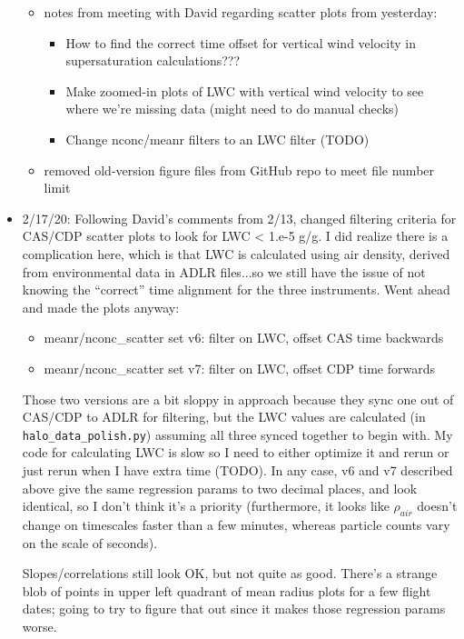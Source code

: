 \documentclass{article}
\begin{document}
\begin{itemize}
\begin{itemize}
		\item notes from meeting with David regarding scatter plots from yesterday:
		\begin{itemize}
			\item How to find the correct time offset for vertical wind velocity in supersaturation calculations???
			\item Make zoomed-in plots of LWC with vertical wind velocity to see where we're missing data (might need to do manual checks)
			\item Change nconc/meanr filters to an LWC filter (TODO)
		\end{itemize}
		\item removed old-version figure files from GitHub repo to meet file number limit
	\end{itemize}
	\item 2/17/20: Following David's comments from 2/13, changed filtering criteria for CAS/CDP scatter plots to look for LWC < 1.e-5 g/g. I did realize there is a complication here, which is that LWC is calculated using air density, derived from environmental data in ADLR files...so we still have the issue of not knowing the ``correct'' time alignment for the three instruments. Went ahead and made the plots anyway:
	\begin{itemize}
		\item meanr/nconc\_scatter set v6: filter on LWC, offset CAS time backwards
		\item meanr/nconc\_scatter set v7: filter on LWC, offset CDP time forwards
	\end{itemize}
	Those two versions are a bit sloppy in approach because they sync one out of CAS/CDP to ADLR for filtering, but the LWC values are calculated (in \texttt{halo\_data\_polish.py}) assuming all three synced together to begin with. My code for calculating LWC is slow so I need to either optimize it and rerun or just rerun when I have extra time (TODO). In any case, v6 and v7 described above give the same regression params to two decimal places, and look identical, so I don't think it's a priority (furthermore, it looks like $\rho_{air}$ doesn't change on timescales faster than a few minutes, whereas particle counts vary on the scale of seconds).

Slopes/correlations still look OK, but not quite as good. There's a strange blob of points in upper left quadrant of mean radius plots for a few flight dates; going to try to figure that out since it makes those regression params worse.


\end{itemize}
\end{document}
